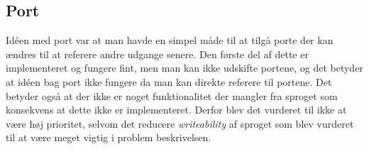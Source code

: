 \subsection*{Port}
Idéen med port var at man havde en simpel måde til at tilgå porte der kan ændres til at referere andre udgange senere. Den første del af dette er implementeret og fungere fint, men man kan ikke udskifte portene, og det betyder at idéen bag port ikke fungere da man kan direkte referere til portene. Det betyder også at der ikke er noget funktionalitet der mangler fra sproget som konsekvens at dette ikke er implementeret. Derfor blev det vurderet til ikke at være høj prioritet, selvom det reducere \textit{writeability} af sproget som blev vurderet til at være meget vigtig i problem beskrivelsen. 